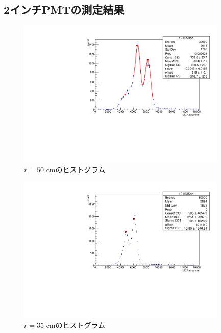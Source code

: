  
 
\subsection{2インチPMTの測定結果}

\begin{figure}[h]
	\centering
	\includegraphics[angle=-90,width=10cm]{fig/iguchi/121550on.pdf}
	\caption{$r=50$ cmのヒストグラム}
	\label{hist50}
\end{figure}

\begin{figure}[h]
	\centering
	\includegraphics[angle=-90,width=10cm]{fig/iguchi/121635on.pdf}
	\caption{$r=35$ cmのヒストグラム}
	\label{hist35}
\end{figure}

